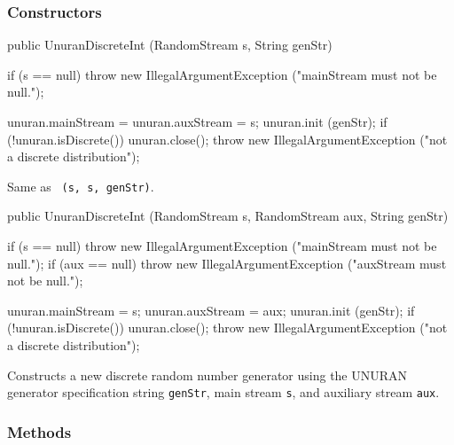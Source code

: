 \subsubsection* {Constructors}
\begin{code}

   public UnuranDiscreteInt (RandomStream s, String genStr)\begin{hide} {
      if (s == null)
         throw new IllegalArgumentException ("mainStream must not be null.");

      unuran.mainStream = unuran.auxStream = s;
      unuran.init (genStr);
      if (!unuran.isDiscrete()) {
         unuran.close();
         throw new IllegalArgumentException ("not a discrete distribution");
      }
   }\end{hide}
\end{code}
\begin{tabb}   
  Same as ~\texttt{(s, s, genStr)}.
\end{tabb}
\begin{code}

   public UnuranDiscreteInt (RandomStream s, RandomStream aux,
                             String genStr)\begin{hide} {
      if (s == null)
         throw new IllegalArgumentException ("mainStream must not be null.");
      if (aux == null)
         throw new IllegalArgumentException ("auxStream must not be null.");

      unuran.mainStream = s;
      unuran.auxStream = aux;
      unuran.init (genStr);
      if (!unuran.isDiscrete()) {
         unuran.close();
         throw new IllegalArgumentException ("not a discrete distribution");
      }
   }\end{hide}
\end{code}
\begin{tabb}
  Constructs a new discrete random number generator using
  the UNURAN generator specification string \texttt{genStr},
  main stream \texttt{s}, and auxiliary stream \texttt{aux}.
\end{tabb}


\subsubsection* {Methods}

